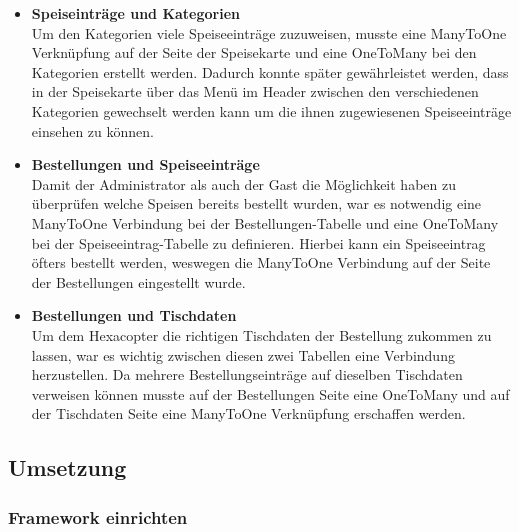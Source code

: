 \begin{itemize}
    \item \textbf{Speiseinträge und Kategorien}\\
Um den Kategorien viele Speiseeinträge zuzuweisen, musste eine ManyToOne Verknüpfung auf der Seite der Speisekarte und eine OneToMany bei den Kategorien erstellt werden. Dadurch konnte später gewährleistet werden, dass in der Speisekarte über das Menü im Header zwischen den verschiedenen Kategorien gewechselt werden kann um die ihnen zugewiesenen Speiseeinträge einsehen zu können.
    \item \textbf{Bestellungen und Speiseeinträge}\\
Damit der Administrator als auch der Gast die Möglichkeit haben zu überprüfen welche Speisen bereits bestellt wurden, war es notwendig eine ManyToOne Verbindung bei der Bestellungen-Tabelle und eine OneToMany bei der Speiseeintrag-Tabelle zu definieren. Hierbei kann ein Speiseeintrag öfters bestellt werden, weswegen die ManyToOne Verbindung auf der Seite der Bestellungen eingestellt wurde. 
\pagebreak
    \item \textbf{Bestellungen und Tischdaten}\\ 
Um dem Hexacopter die richtigen Tischdaten der Bestellung zukommen zu lassen, war es wichtig zwischen diesen zwei Tabellen eine Verbindung herzustellen. Da mehrere Bestellungseinträge auf dieselben Tischdaten verweisen können musste auf der Bestellungen Seite eine OneToMany und auf der Tischdaten Seite eine ManyToOne Verknüpfung erschaffen werden.
  \end{itemize}  

  \subsection{Umsetzung}

    \subsubsection{Framework einrichten}

